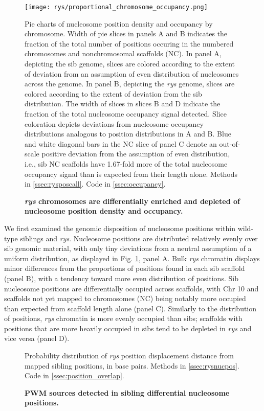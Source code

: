  \begin{figure}[!h]
    \texttt{[image: rys/proportional\_chromosome\_occupancy.png]}
    \caption{{\bf \textit{rys} chromosomes are differentially enriched and depleted of nucleosome position density and occupancy.}}
    Pie charts of nucleosome position density and occupancy by chromosome. Width of pie slices in panels A and B indicates the fraction of the total number of positions occuring in the numbered chromosomes and nonchromosomal scaffolds (NC). In panel A, depicting the sib genome, slices are colored according to the extent of deviation from an assumption of even distribution of nucleosomes across the genome. In panel B, depicting the \textit{rys} genome, slices are colored according to the extent of deviation from the sib distribution. The width of slices in slices B and D indicate the fraction of the total nucleosome occupancy signal detected. Slice coloration depicts deviations from nucleosome occupancy distributions analogous to position distributions in A and B. Blue and white diagonal bars in the NC slice of panel C denote an out-of-scale positive deviation from the assumption of even distribution, i.e., sib NC scaffolds have 1.67-fold more of the total nucleosome occupancy signal than is expected from their length alone.
    Methods in \autoref{ssec:rysposcall}.
    Code in \autoref{ssec:occupancy}.
    \label{nucgendist}
    \end{figure}
    
 We first examined the genomic disposition of nucleosome positions within wild-type siblings and \textit{rys}. Nucleosome positions are distributed relatively evenly over sib genomic material, with only tiny deviations from a neutral assumption of a uniform distribution, as displayed in Fig. \ref{nucgendist}, panel A. Bulk \textit{rys} chromatin displays minor differences from the proportions of positions found in each sib scaffold (panel B), with a tendency toward more even distribution of positions. Sib nucleosome positions are differentially occupied across scaffolds, with Chr 10 and scaffolds not yet mapped to chromosomes (NC) being notably more occupied than expected from scaffold length alone (panel C). Similarly to the distribution of positions, \textit{rys} chromatin is more evenly occupied than sibs; scaffolds with positions that are more heavily occupied in sibs tend to be depleted in \textit{rys} and vice versa (panel D). 


\begin{figure}[!h]
    \caption{{\bf PWM sources detected in sibling differential nucleosome positions.}}
    Probability distribution of \textit{rys} position displacement distance from mapped sibling positions, in base pairs. 
    \label{shiftdist}
    Methods in \autoref{ssec:rysnucpos}.
    Code in \autoref{ssec:position_overlap}.
\end{figure}

